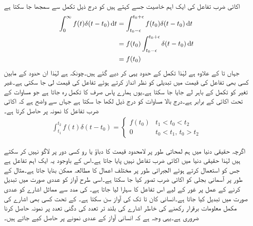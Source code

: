 اکائی ضرب تفاعل کی ایک اہم خاصیت جسے  کہتے ہیں کو درج ذیل تکمل سے سمجھا جا سکتا ہے
\begin{align*}
\int_0^{\infty} f(t) \delta(t-t_0) \dif t&=\int_{t_0-\epsilon}^{t_0+\epsilon} f(t_0) \delta(t-t_0) \dif t\\
&=f(t_0) \int_{t_0-\epsilon}^{t_0+\epsilon} \delta(t-t_0) \dif t\\
&= f(t_0)
\end{align*}
جہاں  تا  کے علاوہ  ہے لہٰذا تکمل کے حدود یہی کر دیے گئے ہیں۔چونکہ  ہے لہٰذا ان حدود کے مابین کسی بھی تفاعل کی قیمت میں تبدیلی کو نظر انداز کرتے ہوئے تفاعل کی قیمت  لی جا سکتی ہے۔غیر تغیر  کو تکمل کے باہر لے جایا جا سکتا ہے۔یوں ہمارے پاس صرف  کا تکمل رہ جاتا ہے جو مساوات  کے تحت اکائی کے برابر ہے۔درج بالا مساوات کو درج ذیل لکھا جا سکتا ہے جہاں سے واضح ہے کہ اکائی ضرب تفاعل  کا نمونہ  پر حاصل کرتا ہے۔
\begin{align}\label{مساوات_لاپلاس_خاصیت_نمونہ_بندی}
\int_{t_1}^{t_2} f(t) \delta(t-t_0)=
\begin{cases}
f(t_0)& t_1<t_0<t_2\\
0&t_0<t_1, \, t_0>t_2 
\end{cases}
\end{align}

اگرچہ حقیقی دنیا میں ہم لمحاتی طور پر لامحدود قیمت کا دباؤ یا رو کسی دور پر لاگو نہیں کر سکتے  ہیں لہٰذا حقیقی دنیا میں اکائی ضرب تفاعل نہیں پایا جاتا ہے۔اس کے باوجود یہ ایک اہم تفاعل ہے جس کو استعمال کرتے ہوئے الجبرائی طور پر مختلف اعمال کا مطالعہ ممکن بنایا جاتا ہے۔مثال کے طور پر آسمانی بجلی کو اکائی ضرب تصور کیا جا سکتا ہے۔اسی طرح آواز کو عددی صورت میں تبدیل کرنے کے عمل پر غور کے لیے اس تفاعل کا سہارا لیا جاتا ہے۔  کی مدد سے مماثل اشارے کو عددی صورت میں  تبدیل کیا جاتا ہے۔انسانی کان  تا  تک کی آواز سن سکتا ہے۔  کے تحت کسی بھی اشارے کی مکمل معلومات برقرار رکھنے کی خاطر اشارے کی بلند تر تعدد کی دگنی تعدد پر نمونہ حاصل کرنا ضروری ہے۔یہی وجہ ہے کہ انسانی آواز کے عددی نمونے  پر حاصل کیے جاتے ہیں۔

